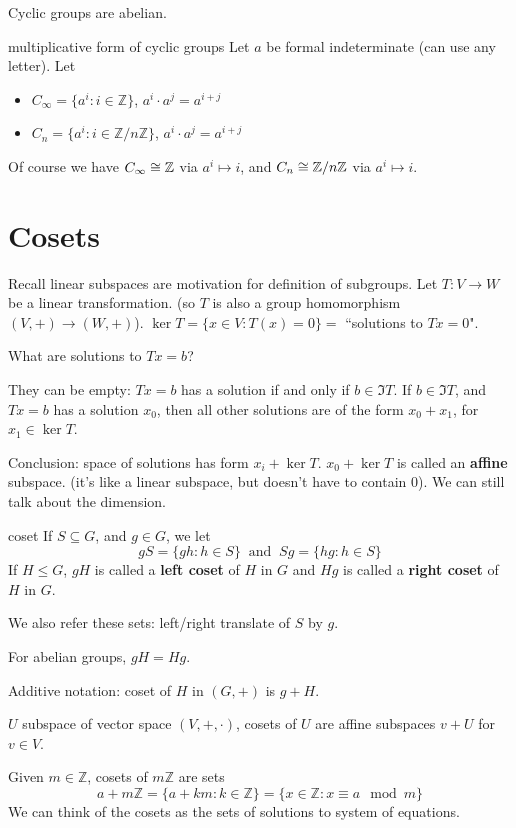 \begin{corr}
Cyclic groups are abelian.
\end{corr}

\begin{defn}{multiplicative form of cyclic groups}
Let $a$ be formal indeterminate (can use any letter). Let 
\begin{itemize}
\item $C_\infty=\{a^i:i\in \mathbb Z\}$, $a^i \cdot a^j = a^{i+j}$
\item $C_n =\{a^i:i\in \mathbb Z/n \mathbb Z\}$, $a^i\cdot a^j=a^{i+j}$
\end{itemize}
\end{defn}
Of course we have $C_\infty \cong \mathbb Z$ via $a^i\mapsto i$, and $C_n\cong \mathbb Z/n\mathbb Z$ via $a^i\mapsto i$.

\section{Cosets}
Recall linear subspaces are motivation for definition of subgroups. Let $T:V\to W$ be a linear transformation. (so $T$ is also a group homomorphism $(V,+)\to (W,+)$). $\ker T=\{x\in V:T(x)=0\}= $ ``solutions to $Tx=0$".

What are solutions to $Tx=b$?

They can be empty: $Tx=b$ has a solution if and only if $b\in \Im T$. If $b\in \Im T$, and $Tx=b$ has a solution $x_0$, then all other solutions are of the form $x_0+x_1$, for $x_1\in \ker T$.

Conclusion: space of solutions has form $x_i+\ker T$. $x_0+\ker T$ is called an \textbf{affine} subspace. (it's like a linear subspace, but doesn't have to contain 0). We can still talk about the dimension.

\begin{defn}{coset}
If $S\subseteq G$, and $g\in G$, we let 
$$gS=\{gh:h\in S\} ~\text{ and }~ Sg=\{hg:h\in S\}$$
If $H\le G$, $gH$ is called a \textbf{left coset} of $H$ in $G$ and $Hg$ is called a \textbf{right coset} of $H$ in $G$.
\end{defn}
\begin{remark}
We also refer these sets: left/right translate of $S$ by $g$.

For abelian groups, $gH=Hg$.

Additive notation: coset of $H$ in $(G,+)$ is $g+H$.
\end{remark}

\begin{ex}
$U$ subspace of vector space $(V,+,\cdot)$, cosets of $U$ are affine subspaces $v+U$ for $v\in V$.

Given $m\in \mathbb Z$, cosets of $m\mathbb Z$ are sets
$$a+m\mathbb Z=\{a+km:k\in \mathbb Z\}=\{x\in \mathbb Z:x\equiv a\mod m\}$$
We can think of the cosets as the sets of solutions to system of equations.
\end{ex}


